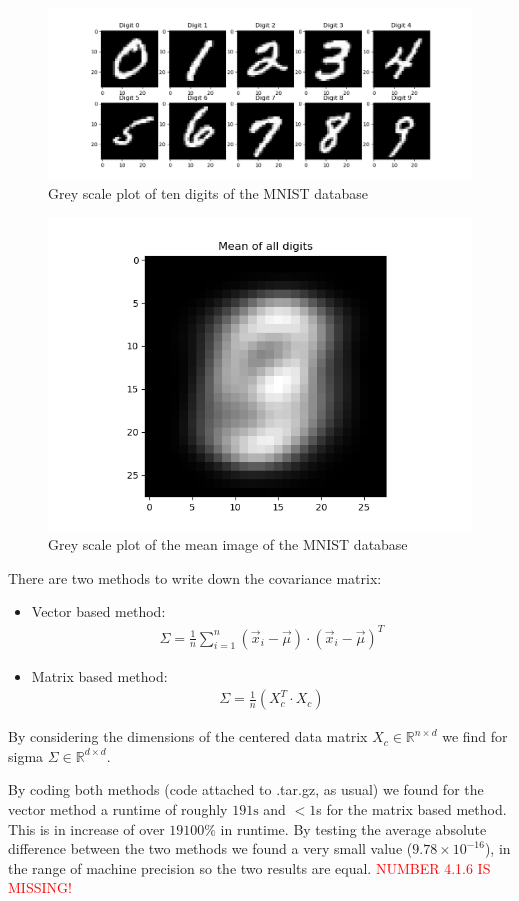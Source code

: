 \documentclass[12pt]{article}
\begin{document}
\begin{figure}[h!]
	\centering
	\includegraphics[width=\linewidth]{../Problem_4/Problem_4.1.1.png}
	\caption{Grey scale plot of ten digits of the MNIST database}
	\label{fig:4.1.1}
\end{figure}

\begin{figure}[h!]
	\centering
	\includegraphics[width=0.66\linewidth]{../Problem_4/Problem_4.1.3_2.png}
	\caption{Grey scale plot of the mean image of the MNIST database}
	\label{fig:4.1.3}
\end{figure}

There are two methods to write down the covariance matrix:
\begin{itemize}
	\item Vector based method:
	\begin{align}
	\Sigma = \frac{1}{n}\sum_{i = 1}^{n} (\vec{x}_i - \vec{\mu})\cdot (\vec{x}_i - \vec{\mu})^T
	\end{align}
	\item Matrix based method:
	\begin{align}
	\Sigma = \frac{1}{n} (X_c^T\cdot X_c)
	\end{align}
\end{itemize}
By considering the dimensions of the centered data matrix $X_c \in \mathbb{R}^{n\times d}$ we find for sigma $\Sigma \in \mathbb{R}^{d\times d}$. \par 
By coding both methods (code attached to .tar.gz, as usual) we found for the vector method a runtime of roughly $191\text{s}$ and $<1$s for the matrix based method. This is in increase of over $19100\%$ in runtime. By testing the average absolute difference between the two methods we found a very small value ($9.78\times 10^{-16}$), in the range of machine precision so the two results are equal.
\textcolor{red}{NUMBER 4.1.6 IS MISSING!}
\end{document}
